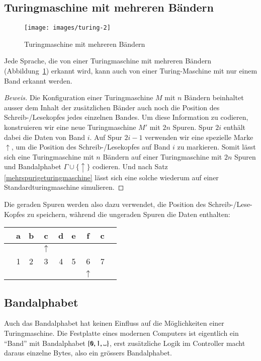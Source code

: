 \subsection{Turingmaschine mit mehreren Bändern}
%
\begin{figure}
\begin{center}
\texttt{[image: images/turing-2]}
\end{center}
\caption{Turingmaschine mit mehreren Bändern\label{multitapetm}}
\end{figure}
\begin{satz}
\label{mehrbandturingmaschine}
Jede Sprache, die von einer Turingmaschine mit mehreren Bändern
(Abbildung~\ref{multitapetm})
erkannt
wird, kann auch von einer Turing-Maschine mit nur einem Band erkannt
werden.
\end{satz}

\begin{proof}[Beweis]
Die Konfiguration einer Turingmaschine $M$ mit $n$ Bändern beinhaltet
ausser dem Inhalt der zusätzlichen Bänder auch noch die Position
des Schreib-/Lesekopfes jedes einzelnen Bandes. Um diese Information
zu codieren, konstruieren wir eine neue Turingmaschine $M'$ mit
$2n$ Spuren. Spur $2i$ enthält dabei die Daten von Band $i$.
Auf Spur $2i-1$ verwenden wir eine spezielle Marke $\uparrow$, um die Position
des Schreib-/Lesekopfes auf Band $i$ zu markieren. Somit lässt sich
eine Turingmaschine mit $n$ Bändern auf einer Turingmaschine mit
$2n$ Spuren und Bandalphabet $\Gamma\cup\{\uparrow\}$ codieren.
Und nach Satz \ref{mehrspurigeturingmaschine} lässt sich eine solche wiederum
auf einer Standardturingmaschine simulieren.
\end{proof}
Die geraden Spuren werden also dazu verwendet, die Position des
Schreib-/Lese-Kopfes zu speichern, während die ungeraden Spuren
die Daten enthalten:
\begin{center}
\begin{tabular}{c|c|c|c|c|c|c|c|c}
\hline
&a&b&c&d&e&f&c&\\
\hline
& & &$\uparrow$& & & & &\\
\hline
&1&2&3&4&5&6&7&\\
\hline
& & & & & &$\uparrow$& &\\
\hline
\end{tabular}
\end{center}

\subsection{Bandalphabet}
Auch das Bandalphabet hat keinen Einfluss auf die Möglichkeiten einer
Turingmaschine. Die Festplatte eines modernen Computers ist eigentlich
ein ``Band'' mit Bandalphabet $\{\texttt{0},1,\blank\}$, erst zusätzliche
Logik im Controller macht daraus einzelne Bytes, also ein grössers
Bandalphabet.

